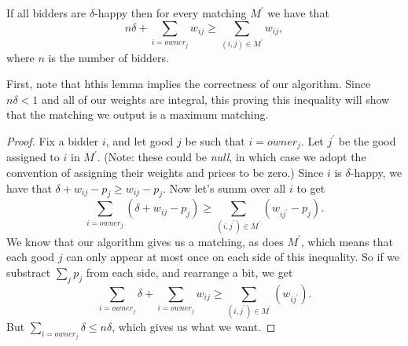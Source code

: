 \documentclass[11pt]{article}
\renewcommand{\'}{^{'}}
\newenvironment{lemma}[2][Lemma]{\begin{trivlist}
\item[\hskip \labelsep {\bfseries #1}\hskip \labelsep {\bfseries #2.}]}{\end{trivlist}}
\begin{document}
\begin{lemma}{}
	If all bidders are $\delta$-happy then for every matching $M\'$ we have that 
	\[
		n\delta + \sum_{i = owner_j} w_{ij} \geq \sum_{(i,j)\in M\'} w_{ij},
	\]
	where $n$ is the number of bidders. 
\end{lemma}

First, note that hthis lemma implies the correctness of our algorithm. Since $n\delta < 1$ and all of 
our weights are integral, this proving this inequality will show that the matching we output is 
a maximum matching.

\begin{proof}
	Fix a bidder $i$, and let good $j$ be such that $i = owner_j$. Let $j\'$ be the good assigned 
	to $i$ in $M\'$. (Note: these could be \emph{null}, in which case we adopt the convention of 
	assigning their weights and prices to be zero.) Since $i$ is $\delta$-happy, we have that 
	$\delta + w_{ij} - p_j \geq w_{ij} - p_j$. Now let's summ over all $i$ to get 
	\[
		\sum_{i=owner_j} (\delta + w_{ij} - p_j) \geq \sum_{(i,j\')\in M\'} (w_{ij\'} - p_j).
	\]
	We know that our algorithm gives us a matching, as does $M\'$, which means that each good $j$ 
	can only appear at most once on each side of this inequality. So if we substract $\sum_j p_j$ 
	from each side, and rearrange a bit, we get 
	\[
		\sum_{i=owner_j} \delta + \sum_{i=owner_j} w_{ij} \geq \sum_{(i,j\')\in M\'} (w_{ij\'}). 
	\]
	But $\sum_{i=owner_j} \delta \leq n\delta$, which gives us what we want.
\end{proof}
\end{document}
